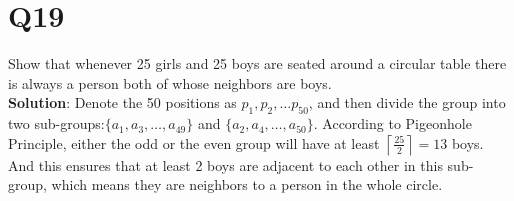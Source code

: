 \documentclass[11pt]{article}
\newenvironment{solution}{{\\\bf Solution}:}{\smallskip}
\begin{document}
\section*{Q19}
Show that whenever 25 girls and 25 boys are seated around a circular table there is always a person both of whose neighbors are boys.
\begin{solution}
    Denote the 50 positions as $p_1,p_2, \ldots p_{50}$, and then 
    divide the group into two sub-groups:$\{ a_1,a_3, \ldots ,a_{49} \}$
    and $\{ a_2,a_4, \ldots ,a_{50} \}$. According to Pigeonhole Principle,
    either the odd or the even group will have at least
    $\left\lceil \frac{25}{2} \right\rceil =13$ boys. And this ensures 
    that at least 2 boys are adjacent to each other in this sub-group, 
    which means they are neighbors to a person in the whole circle.
\end{solution}
\end{document}
